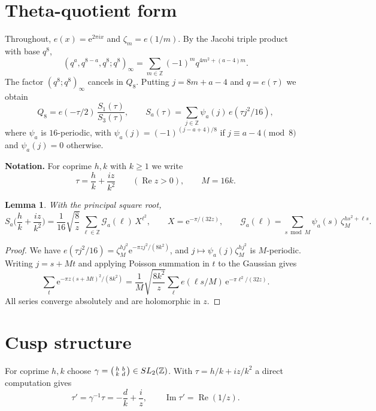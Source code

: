 \documentclass[11pt]{amsart}
\newtheorem{lemma}[theorem]{Lemma}
\theoremstyle{remark}
\theoremstyle{definition}
\newcommand{\Z}{\mathbb Z}
\newcommand{\cG}{\mathcal G}
\newcommand{\Rea}{\operatorname{Re}}
\newcommand{\Ima}{\operatorname{Im}}
\newcommand{\e}{\mathrm e}
\begin{document}
\section{Theta-quotient form}\label{sec:prelim}

Throughout, $e(x)=\e^{2\pi ix}$ and $\zeta_m=e(1/m)$. By the Jacobi triple product with base $q^8$,
\[
(q^a,q^{8-a},q^8;q^8)_\infty=\sum_{m\in\Z}(-1)^mq^{4m^2+(a-4)m}.
\]
The factor $(q^8;q^8)_\infty$ cancels in $Q_8$. Putting $j=8m+a-4$ and $q=e(\tau)$ we obtain
\begin{equation}\label{eq:theta-quotient}
Q_8=e(-\tau/2)\,\frac{S_1(\tau)}{S_3(\tau)},\qquad S_a(\tau)=\sum_{j\in\Z}\psi_a(j)\,e(\tau j^2/16),
\end{equation}
where $\psi_a$ is $16$-periodic, with $\psi_a(j)=(-1)^{(j-a+4)/8}$ if $j\equiv a-4\pmod8$ and $\psi_a(j)=0$ otherwise.

\medskip\noindent\textbf{Notation.} For coprime $h,k$ with $k\ge1$ we write
\[
\tau=\frac hk+\frac{iz}{k^2}\qquad(\Rea z>0),\qquad M=16k .
\]

\begin{lemma}\label{lem:poisson}
With the principal square root,
\[
S_a\Big(\frac hk+\frac{iz}{k^2}\Big)=\frac1{16}\sqrt{\frac8z}\,\sum_{\ell\in\Z}\cG_a(\ell)\,X^{\ell^2},\qquad X=\e^{-\pi/(32z)},\qquad \cG_a(\ell)=\sum_{s\bmod M}\psi_a(s)\,\zeta_M^{hs^2+\ell s}.
\]
\end{lemma}

\begin{proof}
We have $e(\tau j^2/16)=\zeta_M^{hj^2}\e^{-\pi zj^2/(8k^2)}$, and $j\mapsto\psi_a(j)\zeta_M^{hj^2}$ is $M$-periodic. Writing $j=s+Mt$ and applying Poisson summation in $t$ to the Gaussian gives
\[
\sum_{t}\e^{-\pi z(s+Mt)^2/(8k^2)}=\frac1M\sqrt{\frac{8k^2}z}\sum_\ell e(\ell s/M)\,\e^{-\pi\ell^2/(32z)}.
\]
All series converge absolutely and are holomorphic in $z$.
\end{proof}

\section{Cusp structure}\label{sec:cusps}

For coprime $h,k$ choose $\gamma=\begin{psmallmatrix}h&b\\k&d\end{psmallmatrix}\in SL_2(\Z)$. With $\tau=h/k+iz/k^2$ a direct computation gives
\begin{equation}\label{eq:tauprime}
\tau'=\gamma^{-1}\tau=-\frac dk+\frac iz,\qquad \Ima\tau'=\Rea(1/z).
\end{equation}
\end{document}
